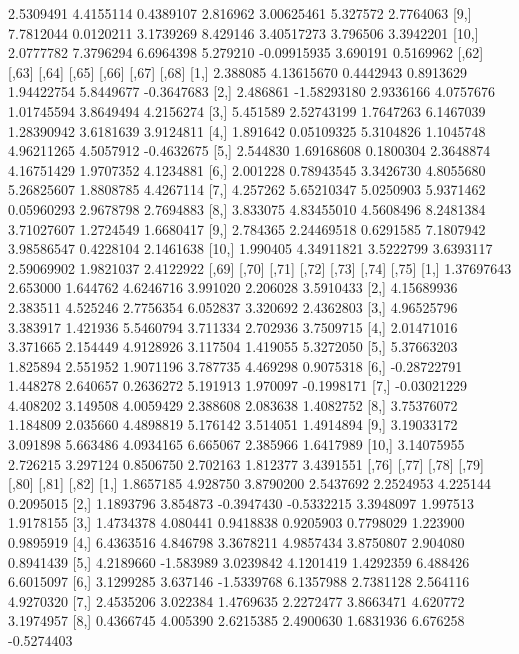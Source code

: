 \documentclass[12pt]{article}
\begin{document}
\begin{Schunk}
\begin{Soutput}
 [8,]  2.5309491 4.4155114 0.4389107 2.816962  3.00625461 5.327572 2.7764063
 [9,]  7.7812044 0.0120211 3.1739269 8.429146  3.40517273 3.796506 3.3942201
[10,]  2.0777782 7.3796294 6.6964398 5.279210 -0.09915935 3.690191 0.5169962
         [,62]       [,63]     [,64]     [,65]      [,66]     [,67]      [,68]
 [1,] 2.388085  4.13615670 0.4442943 0.8913629 1.94422754 5.8449677 -0.3647683
 [2,] 2.486861 -1.58293180 2.9336166 4.0757676 1.01745594 3.8649494  4.2156274
 [3,] 5.451589  2.52743199 1.7647263 6.1467039 1.28390942 3.6181639  3.9124811
 [4,] 1.891642  0.05109325 5.3104826 1.1045748 4.96211265 4.5057912 -0.4632675
 [5,] 2.544830  1.69168608 0.1800304 2.3648874 4.16751429 1.9707352  4.1234881
 [6,] 2.001228  0.78943545 3.3426730 4.8055680 5.26825607 1.8808785  4.4267114
 [7,] 4.257262  5.65210347 5.0250903 5.9371462 0.05960293 2.9678798  2.7694883
 [8,] 3.833075  4.83455010 4.5608496 8.2481384 3.71027607 1.2724549  1.6680417
 [9,] 2.784365  2.24469518 0.6291585 7.1807942 3.98586547 0.4228104  2.1461638
[10,] 1.990405  4.34911821 3.5222799 3.6393117 2.59069902 1.9821037  2.4122922
            [,69]    [,70]    [,71]     [,72]    [,73]    [,74]      [,75]
 [1,]  1.37697643 2.653000 1.644762 4.6246716 3.991020 2.206028  3.5910433
 [2,]  4.15689936 2.383511 4.525246 2.7756354 6.052837 3.320692  2.4362803
 [3,]  4.96525796 3.383917 1.421936 5.5460794 3.711334 2.702936  3.7509715
 [4,]  2.01471016 3.371665 2.154449 4.9128926 3.117504 1.419055  5.3272050
 [5,]  5.37663203 1.825894 2.551952 1.9071196 3.787735 4.469298  0.9075318
 [6,] -0.28722791 1.448278 2.640657 0.2636272 5.191913 1.970097 -0.1998171
 [7,] -0.03021229 4.408202 3.149508 4.0059429 2.388608 2.083638  1.4082752
 [8,]  3.75376072 1.184809 2.035660 4.4898819 5.176142 3.514051  1.4914894
 [9,]  3.19033172 3.091898 5.663486 4.0934165 6.665067 2.385966  1.6417989
[10,]  3.14075955 2.726215 3.297124 0.8506750 2.702163 1.812377  3.4391551
          [,76]     [,77]      [,78]      [,79]     [,80]    [,81]      [,82]
 [1,] 1.8657185  4.928750  3.8790200  2.5437692 2.2524953 4.225144  0.2095015
 [2,] 1.1893796  3.854873 -0.3947430 -0.5332215 3.3948097 1.997513  1.9178155
 [3,] 1.4734378  4.080441  0.9418838  0.9205903 0.7798029 1.223900  0.9895919
 [4,] 6.4363516  4.846798  3.3678211  4.9857434 3.8750807 2.904080  0.8941439
 [5,] 4.2189660 -1.583989  3.0239842  4.1201419 1.4292359 6.488426  6.6015097
 [6,] 3.1299285  3.637146 -1.5339768  6.1357988 2.7381128 2.564116  4.9270320
 [7,] 2.4535206  3.022384  1.4769635  2.2272477 3.8663471 4.620772  3.1974957
 [8,] 0.4366745  4.005390  2.6215385  2.4900630 1.6831936 6.676258 -0.5274403

\end{Soutput}
\end{Schunk}
\end{document}
